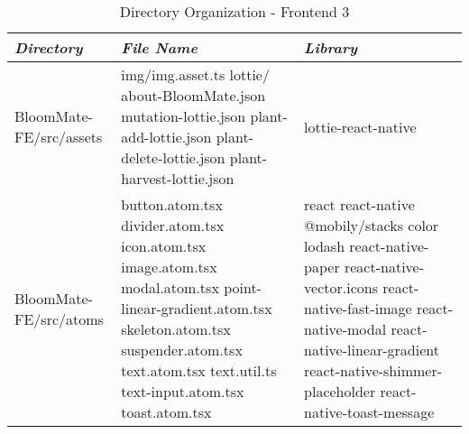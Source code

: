 \documentclass[conference, a4paper]{IEEEtran}
\begin{document}
\begin{table} [htp]
    \caption{Directory Organization - Frontend 3}
    \centering
    \renewcommand{\arraystretch}{1.3}
    \begin{tabular}{p{1.7cm}|p{2.8cm}|p{2.5cm}}
    \hline
    \textit{\textbf{Directory}} & \textit{\textbf{File Name}} & \textit{\textbf{Library}} \\
    \hline
    BloomMate-FE\newline/src/assets & img/img.asset.ts \newline lottie/ \newline about-BloomMate.json \newline
    mutation-lottie.json \newline plant-add-lottie.json \newline plant-delete-lottie.json \newline plant-harvest-lottie.json & lottie-react-native \\
     \hline
BloomMate-FE\newline /src/atoms & button.atom.tsx \newline divider.atom.tsx  \newline icon.atom.tsx
 \newline image.atom.tsx  \newline modal.atom.tsx \newline point-linear-gradient.atom.tsx \newline skeleton.atom.tsx \newline suspender.atom.tsx \newline text.atom.tsx \newline text.util.ts \newline text-input.atom.tsx \newline toast.atom.tsx & react \newline react-native \newline @mobily/stacks \newline color \newline lodash \newline react-native-paper \newline react-native-vector.icons \newline react-native-fast-image \newline react-native-modal \newline react-native-linear-gradient \newline react-native-shimmer-placeholder \newline react-native-toast-message \\

\end{tabular}
\end{table}
\end{document}
